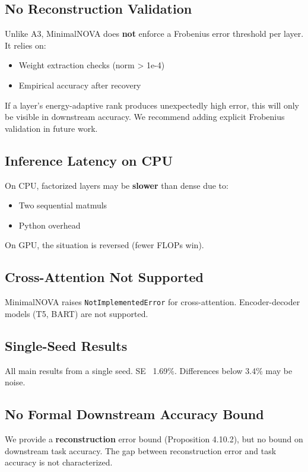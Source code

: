 \subsection{No Reconstruction Validation}

Unlike A3, MinimalNOVA does \textbf{not} enforce a Frobenius error threshold 
per layer. It relies on:
\begin{itemize}
\item Weight extraction checks (norm > 1e-4)
\item Empirical accuracy after recovery

\end{itemize}
If a layer's energy-adaptive rank produces unexpectedly high error, this 
will only be visible in downstream accuracy. We recommend adding explicit 
Frobenius validation in future work.

\subsection{Inference Latency on CPU}

On CPU, factorized layers may be \textbf{slower} than dense due to:
\begin{itemize}
\item Two sequential matmuls
\item Python overhead

\end{itemize}
On GPU, the situation is reversed (fewer FLOPs win).

\subsection{Cross-Attention Not Supported}

MinimalNOVA raises \texttt{NotImplementedError} for cross-attention. Encoder-decoder 
models (T5, BART) are not supported.

\subsection{Single-Seed Results}

All main results from a single seed. SE ~1.69\%. Differences below 3.4\% may 
be noise.

\subsection{No Formal Downstream Accuracy Bound}

We provide a \textbf{reconstruction} error bound (Proposition 4.10.2), but no 
bound on downstream task accuracy. The gap between reconstruction error and 
task accuracy is not characterized.

